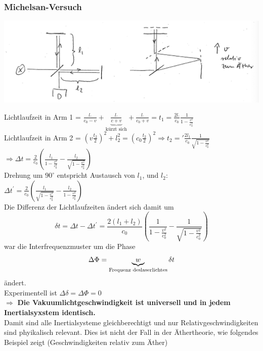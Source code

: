 \documentclass[11pt]{article}
\begin{document}
							\subsubsection{Michelsan-Versuch}
								\begin{center}
									\includegraphics[scale=0.5]{michelsan.png}
								\end{center}
							Lichtlaufzeit in Arm 1 = $\frac{l_\prime}{c_0 - v} + \underbrace{\frac{l_\prime}{c + v} }_{\text{kürzt sich}} + \frac{l_\prime}{c_0 + v} = t_1 = \frac{2 l_\prime}{c_0}\frac{1}{1-\frac{v^2}{c_0^2}}$\\
							Lichtlaufzeit in Arm 2 = $ (v\frac{t_2}{2})^2 + l_2^2 = (c_0 \frac{t_2}{2})^2 \Rightarrow t_2 =' \frac{2 l_1}{c_0} \frac{1}{\sqrt{1 - \frac{v^2}{c_0^2}}} $\\
							$ \Rightarrow \Delta t = \frac{2}{c_0}\left( \frac{l_1}{1- \frac{v^2}{c_0^2}} - \frac{l_2}{\sqrt{1- \frac{v^2}{c_0^2}}} \right) $\\
							Drehung um $ 90^\circ $ entspricht Austausch von $l_1$, und $l_2$:\\
								$\Delta t^\prime = \frac{2}{c_0} \left( \frac{l_1}{\sqrt{1- \frac{v^2}{c_0^2}}} - 
								\frac{l_2}{1- \frac{v^2}{c_0^2}} \right)$\\
								Die Differenz der Lichtlaufzeiten ändert sich damit um
								\[ \delta t = \Delta t - \Delta t^\prime = \frac{2(l_1 + l_2)}{c_0} \left( \frac{1}{1- \frac{v^2}{c_0^2}}- \frac{1}{\sqrt{1- \frac{v^2}{c_0^2}}} \right) \]
						war die Interfrequenzmuster um die Phase
						\[ \Delta \Phi = \underbrace{w}_{\text{Frequenz des \\laserlichtes}} \delta t \]
						ändert.\\
						Experimentell ist $\Delta \delta = \Delta \Phi = 0$\\
						$\Rightarrow$ \textbf{Die Vakuumlichtgeschwindigkeit ist universell und in jedem Inertialsyxstem identisch.}\\
						Damit sind alle Inertialsysteme gleichberechtigt und nur Relativgeschwindigkeiten sind phyikalisch relevant. Dies ist nicht der Fall in der Äthertheorie, wie folgendes Beispiel zeigt (Geschwindigkeiten relativ zum Äther)
\end{document}
